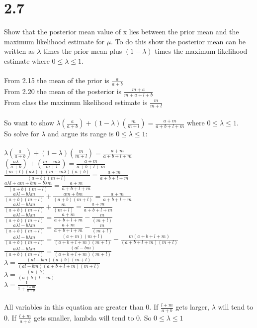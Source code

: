 \documentclass[11pt,leqno,fleqn]{article}
\begin{document}
\section{2.7}
Show that the posterior mean value of x lies between the prior mean and the maximum likelihood estimate for $\mu$. To do this show the posterior mean can be written as $\lambda$ times the prior mean plus $(1 - \lambda)$ times the maximum likelihood estimate where $0 \leq \lambda \leq 1$.\\
\\
From 2.15 the mean of the prior is $\frac{a}{a+b}$\\
From 2.20 the mean of the posterior is $\frac{m + a}{m + a + l + b}$\\
From class the maximum likelihood estimate is $\frac{m}{m+l}$\\
\\
So want to show $\lambda (\frac{a}{a+b}) + (1- \lambda)(\frac{m}{m+l})  = \frac{a+m}{a+b+l+m}$ where $0 \leq \lambda \leq 1$.\\
So solve for $\lambda$ and argue its range is  $0 \leq \lambda \leq 1$:
\\
\\
$\lambda (\frac{a}{a+b}) + (1- \lambda)(\frac{m}{m+l}) =  \frac{a+m}{a+b+l+m} $\\
$ (\frac{a \lambda}{a+b}) +(\frac{m - m \lambda}{m+l}) =  \frac{a+m}{a+b+l+m} $\\
$\frac{(m+l)(a \lambda) + (m - m \lambda)(a + b)}{(a+b)(m+l)}  =  \frac{a+m}{a+b+l+m} $\\
$\frac{a \lambda l + am + bm - b \lambda m}{(a+b)(m+l)} =  \frac{a+m}{a+b+l+m} $\\
$\frac{a \lambda l - b \lambda m}{(a+b)(m+l)} + \frac{am + bm}{(a+b)(m +l)} =  \frac{a+m}{a+b+l+m}$\\
$\frac{a \lambda l - b \lambda m}{(a+b)(m+l)} + \frac{m}{(m +l)} =  \frac{a+m}{a+b+l+m}$\\
$\frac{a \lambda l - b \lambda m}{(a+b)(m+l)} =  \frac{a+m}{a+b+l+m} -   \frac{m}{(m +l)}$\\
$\frac{a \lambda l - b \lambda m}{(a+b)(m+l)} =  \frac{a+m}{a+b+l+m} -   \frac{m}{(m +l)}$\\
$\frac{a \lambda l - b \lambda m}{(a+b)(m+l)} =  \frac{(a+m)(m + l)}{(a+b+l+m)(m+l)} - \frac{m (a + b + l + m)}{(a+b+l+m)(m+l)}$\\
$\frac{a \lambda l - b \lambda m}{(a+b)(m+l)} =  \frac{(al - bm)}{(a+b+l+m)(m+l)}$\\
$\lambda = \frac{(al - bm)(a+b)(m+l)}{(al - bm)(a+b+l+m)(m+l)}$\\
$\lambda = \frac{(a+b)}{(a+b+l+m)}$\\
$\lambda = \frac{1}{1 + \frac{l+m}{a+b}}$\\
\\
All variables in this equation are greater than 0. If  $\frac{l+m}{a+b}$  gets larger, $\lambda$ will tend to 0. If $ \frac{l+m}{a+b}$ gets smaller, lambda will tend to 0.
So $0 \leq \lambda \leq 1$
\end{document}
